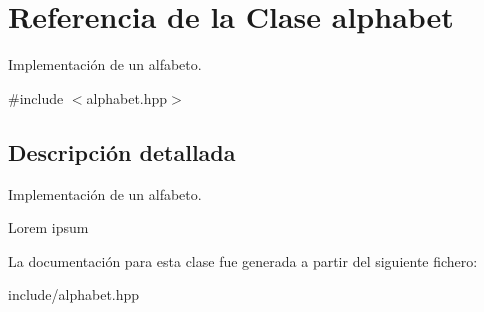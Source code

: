 \hypertarget{classalphabet}{}\section{Referencia de la Clase alphabet}
\label{classalphabet}


Implementación de un alfabeto.  




{\ttfamily \#include $<$alphabet.\+hpp$>$}



\subsection{Descripción detallada}
Implementación de un alfabeto. 

Lorem ipsum 

La documentación para esta clase fue generada a partir del siguiente fichero\+:\begin{DoxyCompactItemize}
\item 
include/alphabet.\+hpp\end{DoxyCompactItemize}
